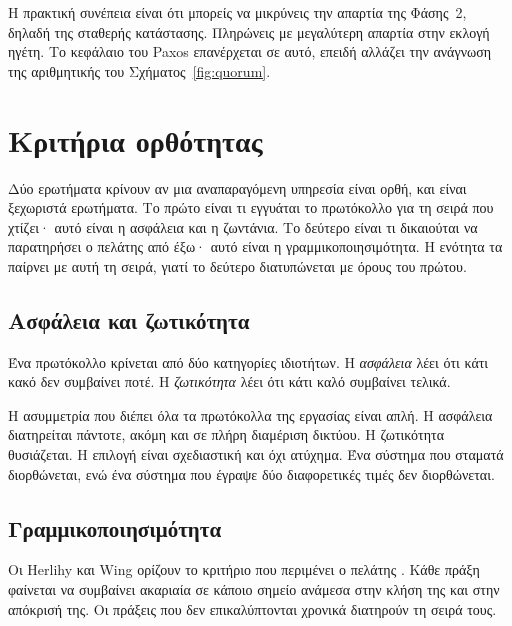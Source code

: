 Η πρακτική συνέπεια είναι ότι μπορείς να μικρύνεις την απαρτία της
Φάσης~2, δηλαδή της σταθερής κατάστασης. Πληρώνεις με μεγαλύτερη απαρτία
στην εκλογή ηγέτη. Το κεφάλαιο του Paxos επανέρχεται σε αυτό, επειδή
αλλάζει την ανάγνωση της αριθμητικής του Σχήματος~\ref{fig:quorum}.

\section{Κριτήρια ορθότητας}
\label{sec:correctness}

Δύο ερωτήματα κρίνουν αν μια αναπαραγόμενη υπηρεσία είναι ορθή, και
είναι ξεχωριστά ερωτήματα. Το πρώτο είναι τι εγγυάται το πρωτόκολλο για
τη σειρά που χτίζει· αυτό είναι η ασφάλεια και η ζωντάνια. Το δεύτερο
είναι τι δικαιούται να παρατηρήσει ο πελάτης από έξω· αυτό είναι η
γραμμικοποιησιμότητα. Η ενότητα τα παίρνει με αυτή τη σειρά, γιατί το
δεύτερο διατυπώνεται με όρους του πρώτου.

\subsection{Ασφάλεια και ζωτικότητα}

Ένα πρωτόκολλο κρίνεται από δύο κατηγορίες ιδιοτήτων. Η \emph{ασφάλεια}
λέει ότι κάτι κακό δεν συμβαίνει ποτέ. Η \emph{ζωτικότητα} λέει ότι κάτι
καλό συμβαίνει τελικά.

Η ασυμμετρία που διέπει όλα τα πρωτόκολλα της εργασίας είναι απλή. Η
ασφάλεια διατηρείται πάντοτε, ακόμη και σε πλήρη διαμέριση δικτύου. Η
ζωτικότητα θυσιάζεται. Η επιλογή είναι σχεδιαστική και όχι ατύχημα. Ένα
σύστημα που σταματά διορθώνεται, ενώ ένα σύστημα που έγραψε δύο
διαφορετικές τιμές δεν διορθώνεται.

\subsection{Γραμμικοποιησιμότητα}

Οι Herlihy και Wing ορίζουν το κριτήριο που περιμένει ο πελάτης
\cite{herlihy1990linearizability}. Κάθε πράξη φαίνεται να συμβαίνει
ακαριαία σε κάποιο σημείο ανάμεσα στην κλήση της και στην απόκρισή της.
Οι πράξεις που δεν επικαλύπτονται χρονικά διατηρούν τη σειρά τους.

